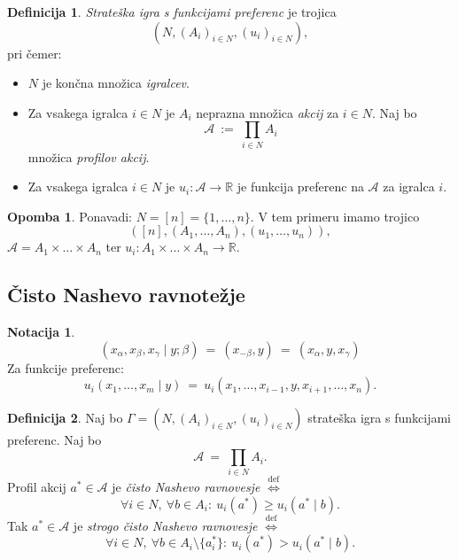 \documentclass[11pt]{article}
\newcommand{\R}{\mathbb{R}}
\newcommand{\A}{\mathscr{A}}
\newcommand{\diff}{\overset{\text{def}}{\iff}}
\newcommand{\set}[1]{\{#1\}}
\newcommand{\1}{\mathbbm{1}}
\theoremstyle{definition}
\newtheorem{definicija}{Definicija}[section]
\theoremstyle{definition}
\theoremstyle{definition}
\theoremstyle{definition}
\newtheorem*{opomba}{Opomba}
\newtheorem*{notacija}{Notacija}
\begin{document}
\begin{definicija}

\textit{Strateška igra s funkcijami preferenc} je trojica
$$(N, (A_i)_{i \in N}, (u_i)_{i \in N}),$$
pri čemer:
\begin{itemize}
	\item $N$ je končna množica \textit{igralcev}.
	\item Za vsakega igralca $i \in N$ je $A_i$ neprazna množica \textit{akcij} za $i \in N$. Naj bo 
	$$\A ~:=~ \prod_{i \in N} A_i$$
	množica \textit{profilov akcij}.
	\item Za vsakega igralca $i \in N$ je $u_i: \A \rightarrow \R$ je funkcija preferenc na $\A$ za igralca $i$.
\end{itemize}

\end{definicija}
\vspace{0.5cm}

\begin{opomba}

Ponavadi: $N = [n] = \set{1,\ldots,n}$. V tem primeru imamo trojico
$$([n],(A_1,\ldots,A_n),(u_1,\ldots,u_n)),$$
$\A=A_1 \times \ldots \times A_n$ ter $u_i: A_1 \times \ldots \times A_n \rightarrow \R$.

\end{opomba}
\vspace{0.5cm}


\subsection{Čisto Nashevo ravnotežje}
\vspace{0.5cm}

\begin{notacija}

$$(x_\alpha, x_\beta, x_\gamma \mid y; \beta) ~=~ (x_{-\beta}, y) ~=~ (x_\alpha, y, x_\gamma)$$
Za funkcije preferenc:
$$u_i(x_1,\ldots,x_m \mid y) ~=~ u_i(x_1,\ldots,x_{i-1},y,x_{i+1},\ldots,x_n).$$

\end{notacija}
\vspace{0.5cm}

\begin{definicija}

Naj bo $\Gamma = (N, (A_i)_{i \in N}, (u_i)_{i \in N})$ strateška igra s funkcijami preferenc. Naj bo
$$\A ~=~ \prod_{i \in N} A_i.$$
Profil akcij $a^* \in \A$ je \textit{čisto Nashevo ravnovesje} $\diff$
$$\forall i \in N, ~\forall b \in A_i: ~u_i(a^*) \geq u_i(a^* \mid b).$$
Tak $a^* \in \A$ je \textit{strogo čisto Nashevo ravnovesje} $\diff$
$$\forall i \in N, ~\forall b \in A_i\setminus\set{a_i^*}: ~u_i(a^*) > u_i(a^* \mid b).$$

\end{definicija}
\vspace{0.5cm}
\end{document}
